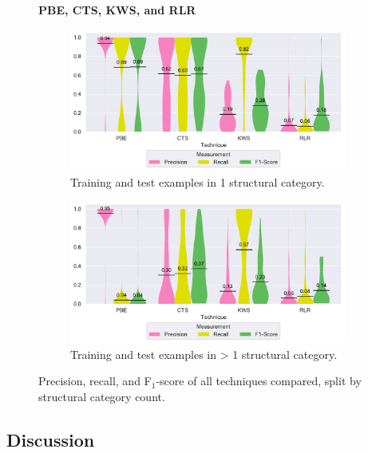 \documentclass[10pt,journal,compsoc]{IEEEtran}
\begin{document}
\begin{figure}
\centering
    \textbf{PBE, CTS, KWS, and RLR}\par\medskip
\begin{subfigure}[b]{\columnwidth}
		\centering
				\includegraphics[width=\columnwidth,
				clip]{img/big-study/recall-precision-singlecategory-all.pdf}
		\caption{Training and test examples in 1
		structural category.}
		\label{fig:recall-precision-singlecategory-all}
\end{subfigure}\hspace{\fill}
\begin{subfigure}[b]{\columnwidth}
		\centering
				\centering
		\includegraphics[width=\columnwidth,
		clip]{img/big-study/recall-precision-multicategory-all.pdf}
		\caption{Training and test examples in \textgreater
		1 structural
		category.}
		\label{fig:recall-precision-multicategory-all}
\end{subfigure}
\caption{Precision, recall, and F$_{1}$-score of all
techniques compared, split by structural category count.}
\label{fig:category-all}
\end{figure}

\subsection{Discussion}
\label{sec:discussion}
\end{document}
